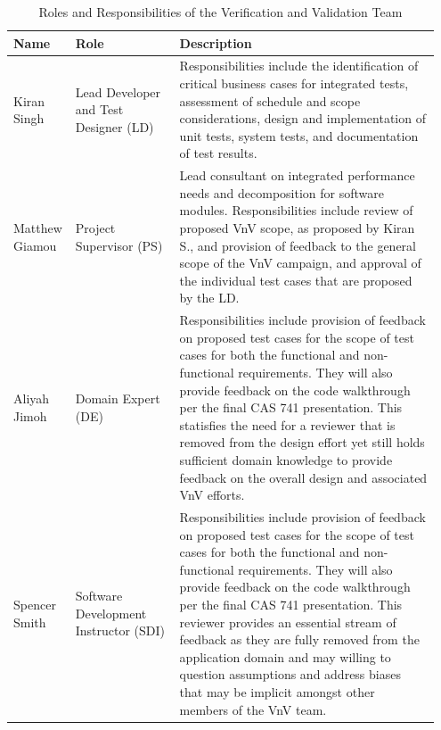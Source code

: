 \documentclass[12pt, titlepage]{article}
\begin{document}
\begin{table}[tbp!]
  \centering
  \begin{tabular}{|p{0.11\linewidth}|p{0.24\linewidth}|p{0.6\linewidth}|} 
    \hline
    \textbf{Name} & \textbf{Role} & \textbf{Description}\\
    \hline
    Kiran Singh & Lead Developer and Test Designer (LD) & Responsibilities include the
    identification of critical business cases for integrated tests, assessment of 
    schedule and scope considerations,  design and implementation of unit tests, 
    system tests, and documentation of test results.\\
    \hline
    Matthew Giamou & Project Supervisor (PS) & Lead consultant on integrated 
    performance needs and decomposition for software modules. Responsibilities 
    include review of proposed VnV scope, as proposed by 
    Kiran S., and provision of feedback to the general scope of the VnV campaign, and approval 
    of the individual test cases that are proposed by the LD. \\
    \hline
    Aliyah Jimoh & Domain Expert (DE) & Responsibilities include provision of 
    feedback on proposed test cases for the 
    scope of test cases for both the functional and non-functional requirements. They 
    will also provide feedback on the code walkthrough per the final CAS 741 presentation. 
    This statisfies the need for a reviewer that is removed from the design effort yet
    still holds sufficient domain knowledge to provide feedback on the overall design 
    and associated VnV efforts.\\ 
    \hline
    Spencer Smith & Software Development Instructor (SDI) & Responsibilities include 
    provision of feedback on proposed test cases for the scope of test cases 
    for both the functional and non-functional requirements. They will also 
    provide feedback on the code walkthrough per the final CAS 741 presentation. 
    This reviewer provides an essential stream of feedback as they are fully removed 
    from the application domain and may willing to question assumptions and address biases 
    that may be implicit amongst other members of the VnV team.\\
    \bottomrule
  \end{tabular}\\
  \caption{Roles and Responsibilities of the Verification and Validation Team}
  \label{Table_Ver_Roles}
\end{table}
\end{document}
